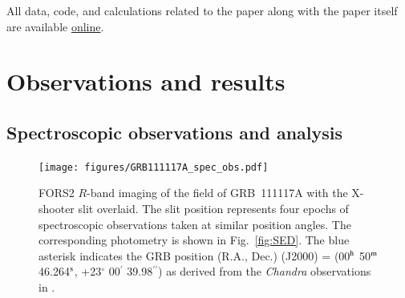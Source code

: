 \documentclass[longauth]{aa}    %
\newcommand{\oiii}{[\ion{O}{iii}]}
\begin{document}
All data, code, and calculations related to the paper along with the
paper itself are available \href{https://github.com/jselsing/GRB111117A}{online}.


\section{Observations and results}

\subsection{Spectroscopic observations and analysis}

\begin{figure}
        \centering
       \texttt{[image: figures/GRB111117A\_spec\_obs.pdf]}
        \caption{
        FORS2 $R$-band imaging of the field of GRB~111117A with the X-shooter slit
overlaid. The slit position represents four epochs of spectroscopic observations
taken at similar position angles. The corresponding photometry is shown in
Fig.~\ref{fig:SED}. The blue asterisk indicates the GRB position (R.A., Dec.) (J2000) = (00$^{\rm h}$ 50$^{\rm m}$ 46.264$^{\rm s}$, +23$^{\circ}$ 00$^{\prime}$ 39.98$^{\prime\prime}$) as derived
from the \emph{Chandra} observations in \citet{Sakamoto2013}.
        }
        \label{fig:spec_setup}
\end{figure}

\end{document}
